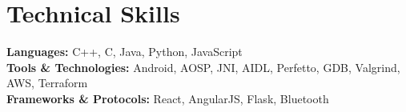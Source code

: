 \section{Technical Skills}
 \begin{itemize}[leftmargin=0.15in, label={}]
    \small{\item{
				\textbf{Languages:} C++, C, Java, Python, JavaScript \\
				\textbf{Tools \& Technologies:} Android, AOSP, JNI, AIDL, Perfetto, GDB, Valgrind, AWS, Terraform \\
				\textbf{Frameworks \& Protocols:} React, AngularJS, Flask, Bluetooth
            }
        }
 \end{itemize}